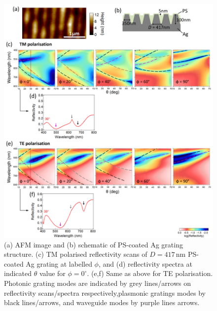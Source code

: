 \begin{figure}[ht] 
\centering    
\includegraphics[width=\textwidth]{Fig11}
\caption{(a) AFM image and (b) schematic of PS-coated Ag grating structure. (c) TM polarised reflectivity scans of $D=417$\,nm PS-coated Ag grating at labelled $\phi$, and (d) reflectivity spectra at indicated $\theta$ value for $\phi=0^{\circ}$. (e,f) Same as above for TE polarisation. Photonic grating modes are indicated by grey lines/arrows on reflectivity scans/spectra respectively,plasmonic gratings modes by black lines/arrows, and waveguide modes by purple lines arrows.}
\label{7Fig11}
\end{figure}

